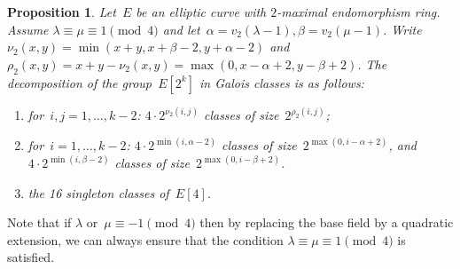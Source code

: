 \documentclass{lms}
\newtheorem{prop}[thm]{Proposition}
\def\mat#1{\begin{pmatrix}#1\end{pmatrix}}
\def\smat#1{{\def\arraystretch{.7}\mat{#1}}}
\def\acco#1{\left\{#1\right\}}
\begin{document}
\begin{prop}\label{prop:orbites-2-torsion}
Let~$E$ be an elliptic curve with $2$-maximal endomorphism ring.
Assume $λ ≡ μ ≡ 1 \pmod{4}$ and let~$α = v_2(λ-1), β=v_2(μ-1)$.
Write~$ν_2(x, y) = \min (x+y, x+β-2, y+α-2)$
and~$ρ_2(x, y) = x+y - ν_2(x, y) = \max (0, x-α+2, y-β+2)$.
The decomposition of the group~$E[2^k]$ in Galois classes is as follows:
\begin{enumerate}
\item for~$i, j = 1, …, k-2$:
$4 · 2^{ν_2(i,j)}$ classes of size~$2^{ρ_2(i,j)}$;
\item for~$i = 1, …, k-2$:
$4 · 2^{\min (i, α-2)}$ classes of size~$2^{\max (0, i-α+2)}$, and
$4 · 2^{\min (i, β-2)}$ classes of size~$2^{\max (0, i-β+2)}$.
\item the 16 singleton classes of~$E[4]$.
\end{enumerate}
\end{prop}
Note that if $λ$ or~$μ ≡ -1 \pmod{4}$ then
by replacing the base field by a quadratic extension,
we can always ensure that the condition $λ ≡ μ ≡ 1 \pmod{4}$ is
satisfied.
% 
% 
\end{document}
